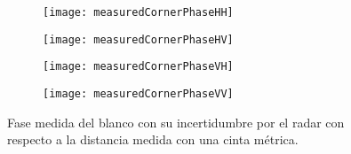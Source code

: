 \begin{figure}[H]
  \centering
  \begin{subfigure}{0.49\textwidth}
    \texttt{[image: measuredCornerPhaseHH]}
  \end{subfigure}
  \begin{subfigure}{0.49\textwidth}
    \texttt{[image: measuredCornerPhaseHV]}
  \end{subfigure}

  \begin{subfigure}{0.49\textwidth}
    \texttt{[image: measuredCornerPhaseVH]}
  \end{subfigure}
  \begin{subfigure}{0.49\textwidth}
    \texttt{[image: measuredCornerPhaseVV]}
  \end{subfigure}
  \caption{Fase medida del blanco con su incertidumbre por el radar con respecto a la distancia medida con una cinta métrica.}
  \label{fig:measuredPhaseCorner}
\end{figure}


